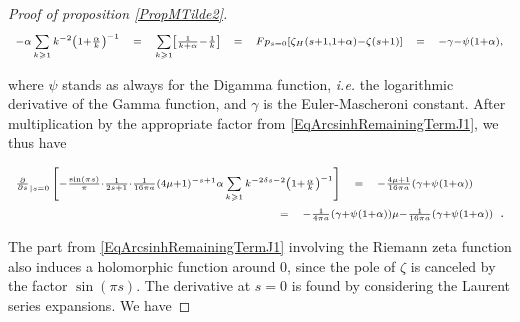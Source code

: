 \documentclass{jams-l}
\theoremstyle{definition}
\theoremstyle{remark}
\numberwithin{equation}{section}
\begin{document}
\begin{proof}[Proof of proposition \ref{PropMTilde2}]
                        \[ \begin{array}{lllllll}
                                \scriptstyle - \alpha \sum\limits_{k \geqslant 1} k^{- 2} \left( 1 + \frac{\alpha}{k} \right)^{-1} & \hspace{-0.34pt} \scriptstyle = \hspace{-0.34pt} & \scriptstyle \sum\limits_{k \geqslant 1} \left[ \frac{1}{k + \alpha} - \frac{1}{k} \right] & \hspace{-0.34pt} \scriptstyle = \hspace{-0.34pt} & \scriptstyle Fp_{s = 0} \left[ \zeta_H \left( s + 1, 1 + \alpha \right) - \zeta \left( s + 1 \right) \right] & \hspace{-0.34pt} \scriptstyle = \hspace{-0.34pt} & \scriptstyle - \gamma - \psi \left( 1 + \alpha \right),
                            \end{array} \]
                        
                        \noindent where $\psi$ stands as always for the Digamma function, \textit{i.e.} the logarithmic derivative of the Gamma function, and $\gamma$ is the Euler-Mascheroni constant. After multiplication by the appropriate factor from \eqref{EqArcsinhRemainingTermJ1}, we thus have
                        
                        \[ \begin{array}{lllll}
                                \multicolumn{3}{l}{\scriptstyle \frac{\partial}{\partial s}_{\left \vert s = 0 \right.} \left[ - \frac{\sin \left( \pi s \right)}{\pi} \cdot \frac{1}{2s+1} \cdot \frac{1}{16 \pi a} \left( 4 \mu + 1 \right)^{-s+1} \alpha  \sum\limits_{k \geqslant 1} k^{- 2 \delta s - 2} \left( 1 + \frac{\alpha}{k} \right)^{-1} \right]} & \scriptstyle = & \scriptstyle - \frac{4 \mu + 1}{16 \pi a} \left( \gamma + \psi \left( 1 + \alpha \right) \right) \\[1em]
                                
                                \qquad \qquad \qquad \qquad \qquad \qquad \qquad \qquad \qquad & \scriptstyle = & \multicolumn{3}{l}{\scriptstyle - \frac{1}{4 \pi a} \left( \gamma + \psi \left( 1 + \alpha \right) \right) \mu - \frac{1}{16 \pi a} \left( \gamma + \psi \left( 1 + \alpha \right) \right)}.
                            \end{array} \]
                        
                        \noindent The part from \eqref{EqArcsinhRemainingTermJ1} involving the Riemann zeta function also induces a holomorphic function around $0$, since the pole of $\zeta$ is canceled by the factor $\sin \left( \pi s \right)$. The derivative at $s=0$ is found by considering the Laurent series expansions. We have
                        

\end{proof}
\end{document}

